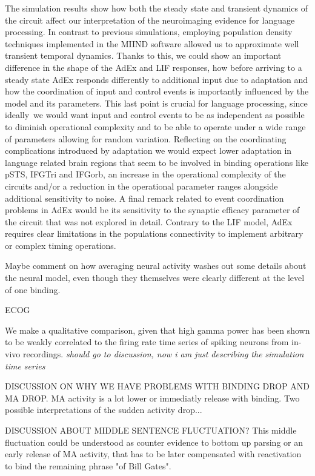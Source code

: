 \documentclass[10pt]{article}
\begin{document}
The simulation results show how both the steady state and transient dynamics of the circuit affect our interpretation of the neuroimaging evidence for language processing.
In contrast to previous simulations\cite{van_der_Velde_2011,van_der_Velde_2010,Frank_2014,van_Dijk_2015}, employing population density techniques implemented in the MIIND software\cite{de_Kamps_2008} allowed us to approximate well transient temporal dynamics.
Thanks to this, we could show an important difference in the shape of the AdEx and LIF responses, how before arriving to a steady state AdEx responds differently to additional input due to adaptation and how the coordination of input and control events is importantly influenced by the model and its parameters.
This last point is crucial for language processing, since ideally~we would want input and control events to be as independent as possible to diminish operational complexity and to be able to operate under a wide range of parameters allowing for random variation.
Reflecting on the coordinating complications introduced by adaptation we would expect lower adaptation in language related brain regions that seem to be involved in binding operations like pSTS, IFGTri and IFGorb, an increase in the operational complexity of the circuits and/or a reduction in the operational parameter ranges alongside additional sensitivity to noise.
A final remark related to event coordination problems in AdEx would be its sensitivity to the synaptic efficacy parameter of the circuit that was not explored in detail.
Contrary to the LIF model, AdEx requires clear limitations in the populations connectivity to implement arbitrary or complex timing operations.


Maybe comment on how averaging neural activity washes out some details about the neural model, even though they themselves were clearly different at the level of one binding.



ECOG

We make a qualitative comparison, given that high gamma power has been shown to be weakly correlated to the firing rate time series of spiking neurons from in-vivo recordings\cite{Ray_2011}. \emph{should go to discussion, now i am just describing the simulation time series}


DISCUSSION ON WHY WE HAVE PROBLEMS WITH BINDING DROP AND MA DROP. MA activity is a lot lower or immediatly release with binding. Two possible interpretations of the sudden activity drop...

DISCUSSION ABOUT MIDDLE SENTENCE FLUCTUATION? This middle fluctuation could be understood as counter evidence to bottom up parsing or an early release of MA activity, that has to be later compensated with reactivation to bind the remaining phrase "of Bill Gates".
\end{document}
